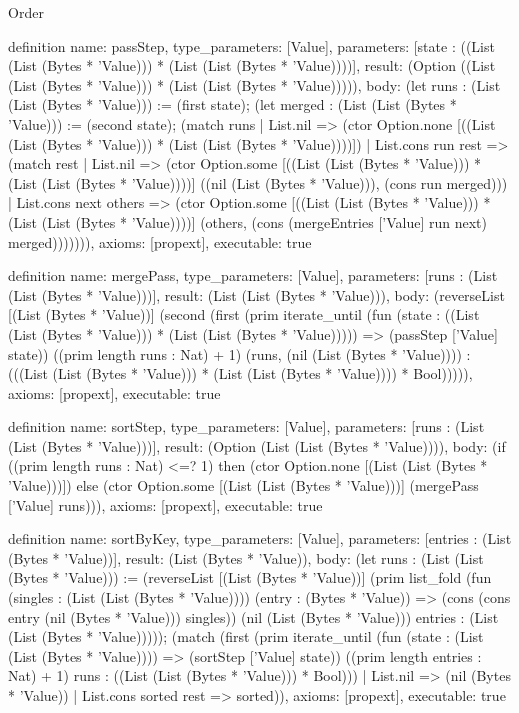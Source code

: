 \begin{lexlean}{Order}
\begin{semanticmodule}
definition{
  name: passStep,
  type_parameters: [Value],
  parameters: [state : ((List (List (Bytes * 'Value))) * (List (List (Bytes * 'Value))))],
  result: (Option ((List (List (Bytes * 'Value))) * (List (List (Bytes * 'Value))))),
  body: (let runs : (List (List (Bytes * 'Value))) := (first state); (let merged : (List (List (Bytes * 'Value))) := (second state); (match runs
    | List.nil => (ctor Option.none [((List (List (Bytes * 'Value))) * (List (List (Bytes * 'Value))))])
    | List.cons run rest => (match rest
      | List.nil => (ctor Option.some [((List (List (Bytes * 'Value))) * (List (List (Bytes * 'Value))))] ((nil (List (Bytes * 'Value))), (cons run merged)))
      | List.cons next others => (ctor Option.some [((List (List (Bytes * 'Value))) * (List (List (Bytes * 'Value))))] (others, (cons (mergeEntries ['Value] run next) merged))))))),
  axioms: [propext],
  executable: true
}

definition{
  name: mergePass,
  type_parameters: [Value],
  parameters: [runs : (List (List (Bytes * 'Value)))],
  result: (List (List (Bytes * 'Value))),
  body: (reverseList [(List (Bytes * 'Value))] (second (first (prim iterate_until (fun (state : ((List (List (Bytes * 'Value))) * (List (List (Bytes * 'Value))))) => (passStep ['Value] state)) ((prim length runs : Nat) + 1) (runs, (nil (List (Bytes * 'Value)))) : (((List (List (Bytes * 'Value))) * (List (List (Bytes * 'Value)))) * Bool))))),
  axioms: [propext],
  executable: true
}

definition{
  name: sortStep,
  type_parameters: [Value],
  parameters: [runs : (List (List (Bytes * 'Value)))],
  result: (Option (List (List (Bytes * 'Value)))),
  body: (if ((prim length runs : Nat) <=? 1) then (ctor Option.none [(List (List (Bytes * 'Value)))]) else (ctor Option.some [(List (List (Bytes * 'Value)))] (mergePass ['Value] runs))),
  axioms: [propext],
  executable: true
}

definition{
  name: sortByKey,
  type_parameters: [Value],
  parameters: [entries : (List (Bytes * 'Value))],
  result: (List (Bytes * 'Value)),
  body: (let runs : (List (List (Bytes * 'Value))) := (reverseList [(List (Bytes * 'Value))] (prim list_fold (fun (singles : (List (List (Bytes * 'Value)))) (entry : (Bytes * 'Value)) => (cons (cons entry (nil (Bytes * 'Value))) singles)) (nil (List (Bytes * 'Value))) entries : (List (List (Bytes * 'Value))))); (match (first (prim iterate_until (fun (state : (List (List (Bytes * 'Value)))) => (sortStep ['Value] state)) ((prim length entries : Nat) + 1) runs : ((List (List (Bytes * 'Value))) * Bool)))
    | List.nil => (nil (Bytes * 'Value))
    | List.cons sorted rest => sorted)),
  axioms: [propext],
  executable: true
}


\end{semanticmodule}
\end{lexlean}
